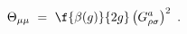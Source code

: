 \begin{equation}
\Theta_{\mu\mu} ~=~
\f{\beta(g)}{2g}\left(G^{a}_{\rho\sigma}\right)^{2} ~.
\end{equation}

